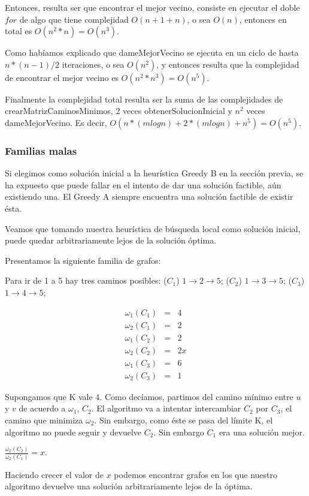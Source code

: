 Entonces, resulta ser que encontrar el mejor vecino, consiste en ejecutar el doble $for$ de algo que tiene complejidad $O(n + 1 + n)$, o sea $O(n)$, entonces en total es $O(n^2 * n) = O(n^3)$.

Como habíamos explicado que dameMejorVecino se ejecuta en un ciclo de hasta $n * (n-1) / 2$ iteraciones, o sea $O(n^2)$, y entonces resulta que la complejidad de encontrar el mejor vecino es $O(n^2 * n^3) = O(n^5)$. 

Finalmente la complejidad total resulta ser la suma de las complejidades de crearMatrizCaminosMinimos, 2 veces obtenerSolucionInicial y $n^2$ veces dameMejorVecino. Es decir, $O(n * (m log n) + 2 * (m log n) + n^5) = O(n^5)$.

\subsubsection{Familias malas}

Si elegimos como solución inicial a la heurística Greedy B en la sección previa, se ha expuesto que puede fallar en el intento de dar una solución factible, aún existiendo una. El Greedy A siempre encuentra una solución factible de existir ésta. 

Veamos que tomando nuestra heurística de búsqueda local como solución inicial, puede quedar arbitrariamente lejos de la solución óptima.

Presentamos la siguiente familia de grafos:


Para ir de 1 a 5 hay tres caminos posibles: ($C_1$) $1 \rightarrow 2 \rightarrow 5$; ($C_2$) $1 \rightarrow 3 \rightarrow 5$;
($C_3$) $1 \rightarrow 4 \rightarrow 5$;

\begin{eqnarray}
 \omega_1(C_1) &=& 4	\\ 
 \omega_2(C_1) &=& 2	\\
 \omega_1(C_2) &=& 2	\\
 \omega_2(C_2) &=& 2x   \\
 \omega_1(C_3) &=& 6	\\
 \omega_2(C_3) &=& 1
\end{eqnarray}

Supongamos que K vale 4.
Como decíamos, partimos del camino mínimo entre $u$ y $v$ de acuerdo a $\omega_1$, $C_2$. El algoritmo va a intentar intercambiar $C_2$ por
$C_3$, el camino que minimiza $\omega_2$. Sin embargo, como éste se pasa del límite K, el algoritmo no puede seguir y devuelve $C_2$. Sin
embargo $C_1$ era una solución mejor.

$\frac{\omega_2(C_2)}{\omega_2(C_1)} = x$.

Haciendo crecer el valor de $x$ podemos encontrar grafos en los que nuestro algoritmo devuelve una
solución arbitrariamente lejos de la óptima.

